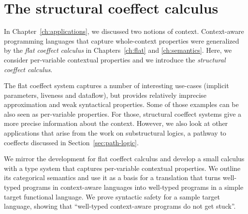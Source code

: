 \chapter{The structural coeffect calculus}
\label{ch:structural}

In Chapter~\ref{ch:applications}, we discussed two notions of context. Context-aware programming
languages that capture whole-context properties were generalized by the \emph{flat coeffect
calculus} in Chapters~\ref{ch:flat} and \ref{ch:semantics}. Here, we consider per-variable
contextual properties and we introduce the \emph{structural coeffect calculus}.

The flat coeffect system captures a number of interesting use-cases (implicit parameters, liveness
and dataflow), but provides relatively imprecise approximation and weak syntactical properties.
Some of those examples can be also seen as per-variable properties. For those, structural coeffect
systems give a more precise information about the context. However, we also look at other applications
that arise from the work on substructural logics, a pathway to coeffects discussed in
Section~\ref{sec:path-logic}.

We mirror the development for flat coeffect calculus and develop a small calculus with a type system
that captures per-variable contextual properties. We outline its categorical semantics and use it as
a basis for a translation that turns well-typed programs in context-aware languages into well-typed
programs in a simple target functional language. We prove syntactic safety for a sample target
language, showing that ``well-typed context-aware programs do not get stuck''.

